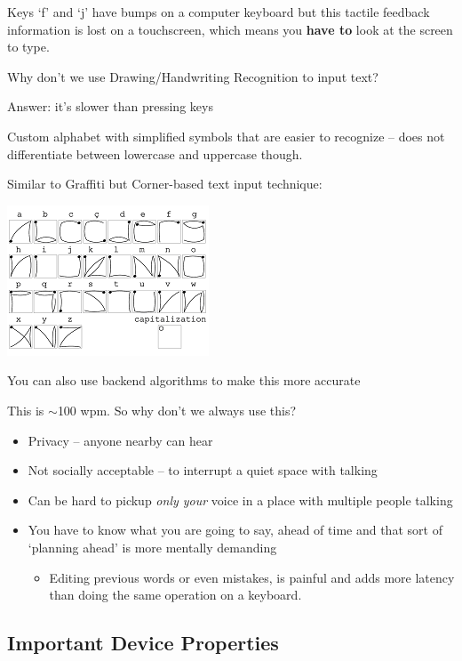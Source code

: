 Keys `f' and `j' have bumps on a computer keyboard but this tactile feedback information is lost on a touchscreen, which means you \textbf{have to} look at the screen to type.

Why don't we use Drawing/Handwriting Recognition to input text?

Answer: it's slower than pressing keys

Custom alphabet with simplified symbols that are easier to recognize -- does not differentiate between lowercase and uppercase though.

Similar to Graffiti but Corner-based text input technique:
\begin{center}
    \includegraphics[scale=1]{lectures/wk5/img/edgewrite.png}
\end{center}

You can also use backend algorithms to make this more accurate

This is $\sim$100 wpm. So why don't we always use this?
\begin{itemize}
    \item Privacy -- anyone nearby can hear
    \item Not socially acceptable -- to interrupt a quiet space with talking
    \item Can be hard to pickup \textit{only your} voice in a place with multiple people talking
    \item You have to know what you are going to say, ahead of time and that sort of `planning ahead' is more mentally demanding
    \begin{itemize}
        \item Editing previous words or even mistakes, is painful and adds more latency than doing the same operation on a keyboard.
    \end{itemize}
\end{itemize}

\subsection{Important Device Properties}
